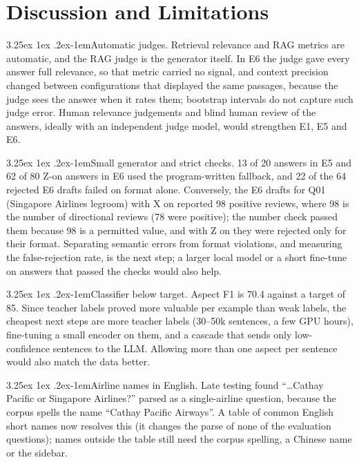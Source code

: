 \documentclass[10pt,twocolumn,a4paper]{article}
\makeatletter
\renewcommand\paragraph{\@startsection{paragraph}{4}{\parindent}%
  {3.25ex \@plus 1ex \@minus .2ex}{-1em}{\normalfont\normalsize\bfseries}}
\makeatother
\begin{document}
\section{Discussion and Limitations}
\label{sec:disc}

\paragraph{Automatic judges.} Retrieval relevance and RAG metrics are automatic, and the RAG judge is the generator
itself. In E6 the judge gave every answer full relevance, so that metric carried no signal, and context
precision changed between configurations that displayed the same passages, because the judge sees the answer when it
rates them; bootstrap intervals do not capture such judge error. Human relevance judgements and blind human review of the
answers, ideally with an independent judge model, would strengthen E1, E5 and E6.

\paragraph{Small generator and strict checks.} 13 of 20 answers in E5 and 62 of 80 Z-on answers in E6 used the
program-written fallback, and 22 of the 64 rejected E6 drafts failed on format alone. Conversely, the E6 drafts for Q01 (Singapore Airlines legroom) with X on
reported 98 positive reviews, where 98 is the number of directional reviews (78 were positive); the number check passed
them because 98 is a permitted value, and with Z on they were rejected only for their format. Separating semantic errors from format violations, and measuring the false-rejection rate,
is the next step; a larger local model or a short fine-tune on answers that passed the checks would also help.

\paragraph{Classifier below target.} Aspect F1 is 70.4 against a target of 85. Since teacher labels proved more valuable
per example than weak labels, the cheapest next steps are more teacher labels (30--50k sentences, a few GPU hours),
fine-tuning a small encoder on them, and a cascade that sends only low-confidence sentences to the LLM. Allowing more
than one aspect per sentence would also match the data better.

\paragraph{Airline names in English.} Late testing found ``\ldots Cathay Pacific or Singapore Airlines?'' parsed as a
single-airline question, because the corpus spells the name ``Cathay Pacific Airways''. A table of common English short
names now resolves this (it changes the parse of none of the evaluation questions); names outside the table still need
the corpus spelling, a Chinese name or the sidebar.
\end{document}
